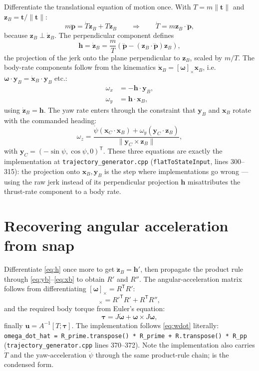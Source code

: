 \documentclass[11pt]{article}
\newcommand{\skewm}[1]{\left[#1\right]_\times}
\begin{document}
Differentiate the translational equation of motion once. With $T = m \|\bm t\|$ and
$\bm z_B = \bm t/\|\bm t\|$:
\begin{equation}
  m \dddot{\bm p} = \dot T \bm z_B + T \dot{\bm z}_B
  \qquad\Longrightarrow\qquad
  \dot T = m \bm z_B \cdot \dddot{\bm p},
  \label{eq:Tdot}
\end{equation}
because $\bm z_B \perp \dot{\bm z}_B$. The perpendicular component defines
\begin{equation}
  \bm h = \dot{\bm z}_B = \frac{m}{T} \left( \dddot{\bm p} - (\bm z_B \cdot
  \dddot{\bm p}) \bm z_B \right),
  \label{eq:h}
\end{equation}
the projection of the jerk onto the plane perpendicular to $\bm z_B$, scaled by $m/T$. The
body-rate components follow from the kinematics $\dot{\bm x}_B = \skewm{\bm\omega} \bm x_B$,
i.e.\ $\bm\omega \cdot \bm y_B = \dot{\bm x}_B \cdot \bm y_B$ etc.:
\begin{align}
  \omega_x &= -\bm h \cdot \bm y_B, \label{eq:wx} \\
  \omega_y &= \bm h \cdot \bm x_B, \label{eq:wy}
\end{align}
using $\dot{\bm z}_B = \bm h$. The yaw rate enters through the constraint that $\bm y_B$ and
$\bm x_B$ rotate with the commanded heading:
\begin{equation}
  \omega_z = \frac{\dot\psi (\bm x_C \cdot \bm x_B) + \omega_y (\bm y_C \cdot \bm z_B)}
    {\|\bm y_C \times \bm z_B\|},
  \label{eq:wz}
\end{equation}
with $\bm y_C = (-\sin\psi, \cos\psi, 0)^{\mathsf T}$. These three equations are exactly
the implementation at \texttt{trajectory\_generator.cpp}
(\texttt{flatToStateInput}, lines 300--315): the projection onto $\bm x_B, \bm y_B$ is the
step where implementations go wrong — using the raw jerk instead of its perpendicular
projection $\bm h$ misattributes the thrust-rate component to a body rate.

\section{Recovering angular acceleration from snap}

Differentiate \eqref{eq:h} once more to get $\ddot{\bm z}_B = \bm h'$, then propagate the
product rule through \eqref{eq:yb}--\eqref{eq:xb} to obtain $R'$ and $R''$. The
angular-acceleration matrix follows from differentiating $[\bm\omega]_\times = R^{\mathsf T}
R'$:
\begin{equation}
  [\dot{\bm\omega}]_\times = R'^{\mathsf T} R' + R^{\mathsf T} R'',
  \label{eq:wdot}
\end{equation}
and the required body torque from Euler's equation:
\begin{equation}
  \bm\tau = J \dot{\bm\omega} + \bm\omega \times J \bm\omega,
  \label{eq:tau}
\end{equation}
finally $\bm u = A^{-1} [T; \bm\tau]$. The implementation follows
\eqref{eq:wdot} literally: \texttt{omega\_dot\_hat = R\_prime.transpose() * R\_prime +
R.transpose() * R\_pp} (\texttt{trajectory\_generator.cpp} lines 370--372). Note the
implementation also carries $\dot T$ and the yaw-acceleration $\ddot\psi$ through the same
product-rule chain;  is the condensed form.
\end{document}
